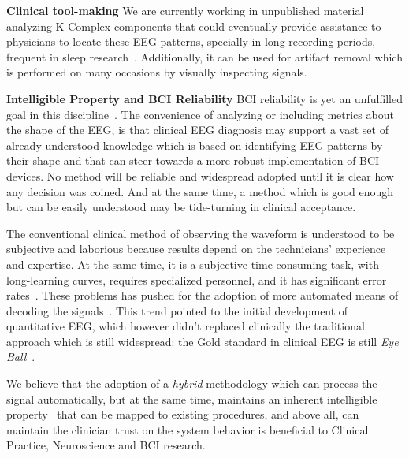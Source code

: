 \textbf{Clinical tool-making}
We are currently working in unpublished material analyzing K-Complex components that could eventually provide  assistance to physicians to locate these EEG patterns, specially in long recording periods, frequent in sleep research~\cite{Michel2012}.  %
Additionally, it can be used for artifact removal which is performed on many occasions by visually inspecting signals. 


\textbf{Intelligible Property and BCI Reliability}
BCI reliability is yet an unfulfilled goal in this discipline~\cite{WolpawJonathanR2012}. The convenience of analyzing or including metrics about the shape of the EEG, is that clinical EEG diagnosis may support a vast set of already understood knowledge which is based on identifying EEG patterns by their shape and that can steer towards a more robust implementation of BCI devices.  No method will be reliable and widespread adopted until it is clear how any decision was coined. And at the same time, a method which is good enough but can be easily understood may be tide-turning in clinical acceptance.

The conventional clinical method of observing the waveform is understood to be subjective and laborious because results depend on the technicians' experience and expertise.   At the same time, it is a subjective time-consuming task, with long-learning curves, requires specialized personnel, and it has significant error rates~\cite{Tjepkema-Cloostermans2018}.  These problems has pushed for the adoption of more automated means of decoding the signals~\cite{Thakor2004}.   This trend pointed to the initial development of quantitative EEG, which however didn't replaced clinically the traditional approach which is still widespread: the Gold standard in clinical EEG is still \textit{Eye Ball}~\cite{Wulsin2011,Tjepkema-Cloostermans2018}.  

We believe that the adoption of a \textit{hybrid} methodology which can process the signal automatically, but at the same time, maintains an inherent intelligible property~\cite{j2018challenge} that can be mapped to existing procedures, and above all, can maintain the clinician trust on the system behavior is beneficial to Clinical Practice, Neuroscience and BCI research. 



